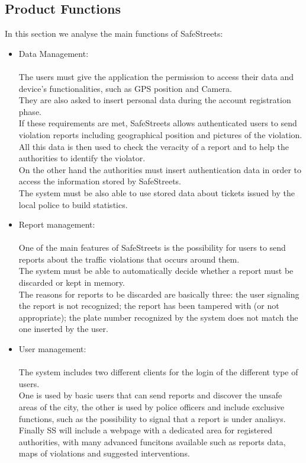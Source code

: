 \subsection{Product Functions}
In this section we analyse the main functions of SafeStreets: 
\begin{itemize}
	\item Data Management: \\ \\
	The users must give the application the permission to access their data and device’s functionalities, such as GPS position and Camera. \\
	They are also asked to insert personal data during the account registration phase. \\
	If these requirements are met, SafeStreets allows authenticated users to send violation reports including geographical position and pictures of the violation. \\
	All this data is then used to check the veracity of a report and to help the authorities to identify the violator. \\
	On the other hand the authorities must insert authentication data in order to access the information stored by SafeStreets. \\
	The system must be also able to use stored data about tickets issued by the local police to build statistics.
	
	\item Report management: \\ \\
	One of the main features of SafeStreets is the possibility for users to send reports about the traffic violations that occurs around them. \\
	The system must be able to automatically decide whether a report must be discarded or kept in memory. \\
	The reasons for reports to be discarded are basically three: the user signaling the report is not recognized; the report has been tampered with (or not appropriate); the plate number recognized by the system does not match the one inserted by the user. 
	
	\item User management: \\ \\
	The system includes two different clients for the login of the different type of users. \\
	One is used by basic users that can send reports and discover the unsafe areas of the city, the other is used by police officers and include exclusive functions, such as the possibility to signal that a report is under analisys. \\
	Finally SS will include a webpage with a dedicated area for registered authorities, with many advanced funcitons available such as  reports data, maps of violations and suggested interventions. \\
	

\end{itemize}
